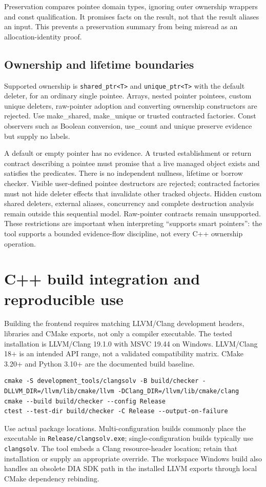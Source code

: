 \documentclass[11pt]{article}
\begin{document}
Preservation compares pointee domain types, ignoring outer ownership wrappers
and const qualification. It promises facts on the result, not that the result
aliases an input. This prevents a preservation summary from being misread as
an allocation-identity proof.

\subsection{Ownership and lifetime boundaries}
Supported ownership is \texttt{shared\_ptr<T>} and \texttt{unique\_ptr<T>}
with the default deleter, for an ordinary single pointee. Arrays, nested
pointer pointees, custom unique deleters, raw-pointer adoption and converting
ownership constructors are rejected. Use make\_shared, make\_unique or
trusted contracted factories. Const observers such as Boolean conversion,
use\_count and unique preserve evidence but supply no labels.

A default or empty pointer has no evidence. A trusted establishment or return
contract describing a pointee must promise that a live managed object exists
and satisfies the predicates. There is no independent nullness, lifetime or
borrow checker. Visible user-defined pointee destructors are rejected;
contracted factories must not hide deleter effects that invalidate other
tracked objects. Hidden custom shared deleters, external aliases, concurrency
and complete destruction analysis remain outside this sequential model.
Raw-pointer contracts remain unsupported. These restrictions are important
when interpreting ``supports smart pointers'': the tool supports a bounded
evidence-flow discipline, not every C++ ownership operation.

\section{C++ build integration and reproducible use}
Building the frontend requires matching LLVM/Clang development headers,
libraries and CMake exports, not only a compiler executable. The tested
installation is LLVM/Clang 19.1.0 with MSVC 19.44 on Windows. LLVM/Clang 18+
is an intended API range, not a validated compatibility matrix. CMake 3.20+
and Python 3.10+ are the documented build baseline.

\begin{lstlisting}
cmake -S development_tools/clangsolv -B build/checker -DLLVM_DIR=/llvm/lib/cmake/llvm -DClang_DIR=/llvm/lib/cmake/clang
cmake --build build/checker --config Release
ctest --test-dir build/checker -C Release --output-on-failure
\end{lstlisting}
Use actual package locations. Multi-configuration builds commonly place the
executable in \texttt{Release/clangsolv.exe}; single-configuration builds
typically use \texttt{clangsolv}. The tool embeds a Clang resource-header
location; retain that installation or supply an appropriate override.
The workspace Windows build also handles an obsolete DIA SDK path in the
installed LLVM exports through local CMake dependency rebinding.
\end{document}
